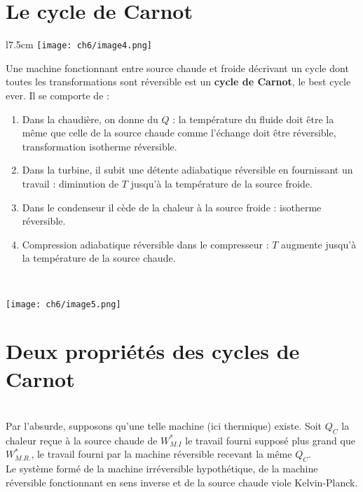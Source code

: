 	\section{Le cycle de Carnot}
	\begin{wrapfigure}[8]{l}{7.5cm}
	\vspace{5mm}
	\texttt{[image: ch6/image4.png]}
	\end{wrapfigure}
	Une machine fonctionnant entre source chaude et froide décrivant 
	un cycle dont toutes les transformations sont réversible est un 
	\textbf{cycle de Carnot}, le best cycle ever. Il se comporte de :
	\begin{enumerate}
	\item Dans la chaudière, on donne du $Q$ : la température du fluide 
	doit être la même que celle de la source chaude comme l'échange 
	doit être réversible,  transformation isotherme réversible.
	\item Dans la turbine, il subit une détente adiabatique réversible 
	en fournissant un travail : diminution de $T$ jusqu'à la température 
	de la source froide.
	\item Dans le condenseur il cède de la chaleur à la source froide : 
	isotherme réversible.
	\item Compression adiabatique réversible dans le compresseur : $T$ 
	augmente jusqu'à la température de la source chaude.
	\end{enumerate}\ 
	\begin{center}
		\texttt{[image: ch6/image5.png]}
	\end{center}
	
	\section{Deux propriétés des cycles de Carnot}
	\ \\
	Par l'absurde, supposons qu'une telle machine (ici thermique) 
	existe. Soit $Q_C$ la chaleur reçue à la source chaude de $W_{M.I}^*$ 
	le travail fourni supposé plus grand que $W_{M.R.}^*$, le travail 
	fourni par la machine réversible recevant la même $Q_C$.\\
	Le système formé de la machine irréversible hypothétique, de la 
	machine réversible fonctionnant en sens inverse et de la source 
	chaude viole Kelvin-Planck.
	
